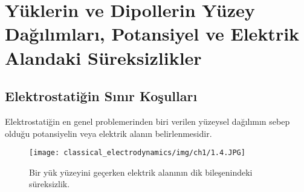 \section{Yüklerin ve Dipollerin Yüzey Dağılımları, Potansiyel ve Elektrik Alandaki Süreksizlikler}
\subsection{Elektrostatiğin Sınır Koşulları}

Elektrostatiğin en genel problemerinden biri verilen yüzeysel dağılımın sebep olduğu potansiyelin veya elektrik alanın belirlenmesidir.

\begin{figure}[h!]
\centering
\texttt{[image: classical\_electrodynamics/img/ch1/1.4.JPG]}
\caption{Bir yük yüzeyini geçerken elektrik alanının dik bileşenindeki süreksizlik.}
\end{figure} 

